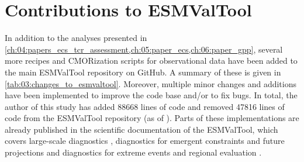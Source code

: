 \section{Contributions to \acs{ESMValTool}}
\label{sec:03:contributions_to_esmvaltool}

In addition to the analyses presented in
\cref{ch:04:papers_ecs_tcr_assessment,ch:05:paper_ecs,ch:06:paper_gpp}, several
more recipes and \ac{CMOR}ization scripts for observational data have been
added to the main \ac{ESMValTool} repository on GitHub. A summary of these is
given in \cref{tab:03:changes_to_esmvaltool}. Moreover, multiple minor changes
and additions have been implemented to improve the code base and/or to fix
bugs. In total, the author of this study has added 88668 lines of code and
removed 47816 lines of code from the \ac{ESMValTool} repository (as of
\TheMonth{}). Parts of these implementations are already published in the
scientific documentation of the \ac{ESMValTool}, which covers large-scale
diagnostics \autocite{Eyring2020}, diagnostics for emergent constraints and
future projections \autocite{Lauer2020} and diagnostics for extreme events and
regional evaluation \autocite{Weigel2020}.

